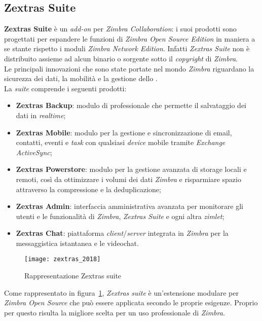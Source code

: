 \subsection{Zextras Suite} \label{subsec:Zextras}
\textbf{Zextras Suite} è un \emph{add-on} per \emph{Zimbra Collaboration}: i suoi prodotti sono progettati per espandere le funzioni di \emph{Zimbra Open Source Edition} in maniera a se stante rispetto i moduli \emph{Zimbra Network Edition}. Infatti \emph{Zextras Suite} non è distribuito assieme ad alcun binario o sorgente sotto il \emph{copyright} di \emph{Zimbra}. \\
Le principali innovazioni che sono state portate nel mondo \emph{Zimbra} riguardano la sicurezza dei dati, la mobilità e la gestione dello .\\ \newpage
La \emph{suite} comprende i seguenti prodotti:
	\begin{itemize}
		\item \textbf{Zextras Backup}: modulo di  professionale che permette il salvataggio dei dati in \emph{realtime};
		\item \textbf{Zextras Mobile}: modulo per la gestione e sincronizzazione di email, contatti, eventi e \emph{task} con qualsiasi \emph{device} mobile tramite \emph{Exchange ActiveSync};
		\item \textbf{Zextras Powerstore}: modulo per la gestione avanzata di storage locali e remoti, così da ottimizzare i volumi dei dati \emph{Zimbra} e risparmiare spazio attraverso la compressione e la deduplicazione;
		\item \textbf{Zextras Admin}: interfaccia amministrativa avanzata per monitorare gli utenti e le funzionalità di \emph{Zimbra}, \emph{Zextras Suite} e ogni altra \emph{zimlet};
		\item \textbf{Zextras Chat}: piattaforma \emph{client}/\emph{server} integrata in \emph{Zimbra} per la messaggistica istantanea e le videochat.
	\end{itemize}

\begin{figure}[H] 
	\centering
	\texttt{[image: zextras\_2018]}
	\caption{Rappresentazione Zextras suite}
	\label{fig:modulizextras}
\end{figure}
Come rappresentato in figura~\ref{fig:modulizextras}, \emph{Zextras suite} è un'estensione modulare per \emph{Zimbra Open Source} che può essere applicata secondo le proprie esigenze. Proprio per questo risulta la migliore scelta per un uso professionale di \emph{Zimbra}.

